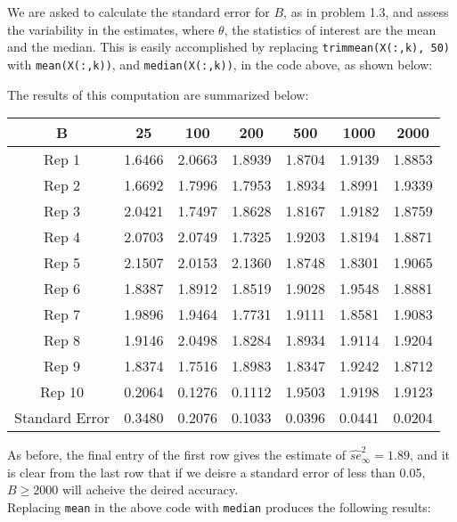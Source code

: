 \documentclass[10pt]{article}
\begin{document}
We are asked to calculate the standard error for $B$, as in problem 1.3, and assess the variability in the estimates, where $\theta$, the statistics of interest are the mean and the median. This is easily accomplished by replacing \texttt{trimmean(X(:,k), 50)} with \texttt{mean(X(:,k))}, and \texttt{median(X(:,k))}, in the code above, as shown below: 

The results of this computation are summarized below:
\begin{center}
\begin{tabular}{|c|cccccc|}
\hline
B & 25& 100 & 200&500 & 1000 & 2000 \\ \hline
Rep 1 &  1.6466  & 2.0663  & 1.8939  & 1.8704   &1.9139  & 1.8853 \\
Rep 2 & 1.6692  & 1.7996 &  1.7953 &  1.8934&   1.8991&   1.9339 \\
Rep 3 & 2.0421  & 1.7497&   1.8628&   1.8167&  1.9182&   1.8759\\
Rep 4 &  2.0703  & 2.0749&   1.7325&   1.9203 &  1.8194 &  1.8871\\
Rep 5 & 2.1507 &  2.0153&   2.1360  & 1.8748 &  1.8301 &  1.9065\\
Rep 6 & 1.8387  & 1.8912  & 1.8519  & 1.9028 &  1.9548  & 1.8881\\
Rep 7 & 1.9896  & 1.9464 &  1.7731  & 1.9111   &1.8581 &  1.9083\\
Rep 8 & 1.9146  & 2.0498  & 1.8284  & 1.8934 &  1.9114   &1.9204\\
Rep 9 & 1.8374  & 1.7516  & 1.8983   &1.8347  & 1.9242 &  1.8712\\
Rep 10 & 0.2064  & 0.1276 &  0.1112  & 1.9503 &  1.9198   &1.9123\\ \hline
Standard Error & 0.3480 & 0.2076 & 0.1033 & 0.0396 &0.0441 &
    0.0204\\
\hline
\end{tabular}
\end{center}
As before, the final entry of the first row gives the estimate of $\widehat{se}_{\infty}^2=1.89$, and it is clear from the last row that if we deisre a standard error of less than 0.05, $B \geq 2000$ will acheive the deired accuracy.\\
Replacing \texttt{mean} in the above code with \texttt{median} produces the following results: 
\end{document}
